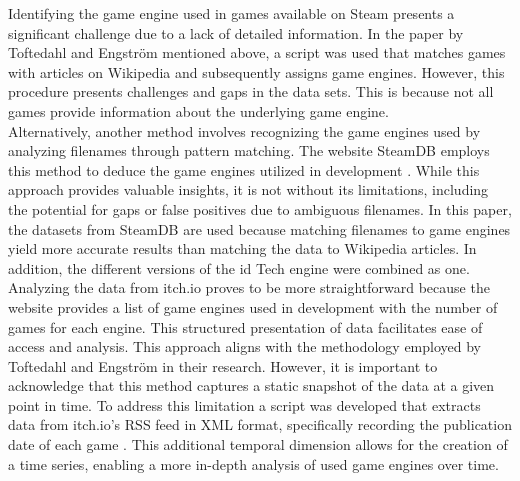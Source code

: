Identifying the game engine used in games available on Steam presents a significant challenge due to a lack of detailed information.
In the paper by Toftedahl and Engström mentioned above, a script was used that matches games with articles on Wikipedia and subsequently assigns game engines.
However, this procedure presents challenges and gaps in the data sets.
This is because not all games provide information about the underlying game engine. \\

Alternatively, another method involves recognizing the game engines used by analyzing filenames through pattern matching.
The website SteamDB employs this method to deduce the game engines utilized in development \cite{steamdb-tech}.
While this approach provides valuable insights, it is not without its limitations, including the potential for gaps or false positives due to ambiguous filenames.
In this paper, the datasets from SteamDB are used because matching filenames to game engines yield more accurate results than matching the data to Wikipedia articles.
In addition, the different versions of the id Tech engine were combined as one. \\

Analyzing the data from itch.io proves to be more straightforward because the website provides a list of game engines used in development with the number of games for each engine.
This structured presentation of data facilitates ease of access and analysis.
This approach aligns with the methodology employed by Toftedahl and Engström in their research.
However, it is important to acknowledge that this method captures a static snapshot of the data at a given point in time.
To address this limitation a script was developed that extracts data from itch.io's RSS feed in XML format, specifically recording the publication date of each game \cite{github-trend-itch}.
This additional temporal dimension allows for the creation of a time series, enabling a more in-depth analysis of used game engines over time.
